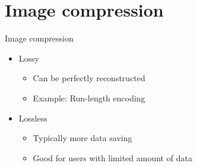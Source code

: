 \section{Image compression} 
\begin{frame}{Image compression}{} 
	\begin{itemize} 
		\item Lossy
			\begin{itemize}
				\item Can be perfectly reconstructed
				\item Example: Run-length encoding
			\end{itemize}
		\item Lossless
			\begin{itemize}
				\item Typically more data saving
				\item Good for users with limited amount of data
			\end{itemize}
	\end{itemize} 
\end{frame}
